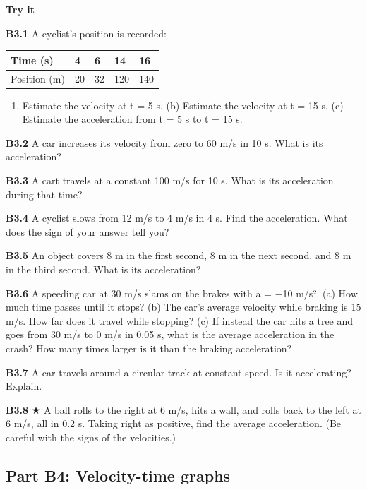 \documentclass[
]{article}
\newcounter{none} %
\providecommand{\tightlist}{%
  \setlength{\itemsep}{0pt}\setlength{\parskip}{0pt}}
\begin{document}
\textbf{Try it}

\textbf{B3.1} A cyclist's position is recorded:

{\def\LTcaptype{none} %
\begin{longtable}[]{@{}lllll@{}}
\toprule\noalign{}
Time (s) & 4 & 6 & 14 & 16 \\
\midrule\noalign{}
\endhead
\bottomrule\noalign{}
\endlastfoot
Position (m) & 20 & 32 & 120 & 140 \\
\end{longtable}
}

\begin{enumerate}
\def\labelenumi{(\alph{enumi})}
\tightlist
\item
  Estimate the velocity at t = 5 s. (b) Estimate the velocity at t = 15
  s. (c) Estimate the acceleration from t = 5 s to t = 15 s.
\end{enumerate}

\textbf{B3.2} A car increases its velocity from zero to 60 m/s in 10 s.
What is its acceleration?

\textbf{B3.3} A cart travels at a constant 100 m/s for 10 s. What is its
acceleration during that time?

\textbf{B3.4} A cyclist slows from 12 m/s to 4 m/s in 4 s. Find the
acceleration. What does the sign of your answer tell you?

\textbf{B3.5} An object covers 8 m in the first second, 8 m in the next
second, and 8 m in the third second. What is its acceleration?

\textbf{B3.6} A speeding car at 30 m/s slams on the brakes with a = −10
m/s². (a) How much time passes until it stops? (b) The car's average
velocity while braking is 15 m/s. How far does it travel while stopping?
(c) If instead the car hits a tree and goes from 30 m/s to 0 m/s in 0.05
s, what is the average acceleration in the crash? How many times larger
is it than the braking acceleration?

\textbf{B3.7} A car travels around a circular track at constant speed.
Is it accelerating? Explain.

\textbf{B3.8} ★ A ball rolls to the right at 6 m/s, hits a wall, and
rolls back to the left at 6 m/s, all in 0.2 s. Taking right as positive,
find the average acceleration. (Be careful with the signs of the
velocities.)

\subsection{Part B4: Velocity-time
graphs}\label{part-b4-velocity-time-graphs}
\end{document}
